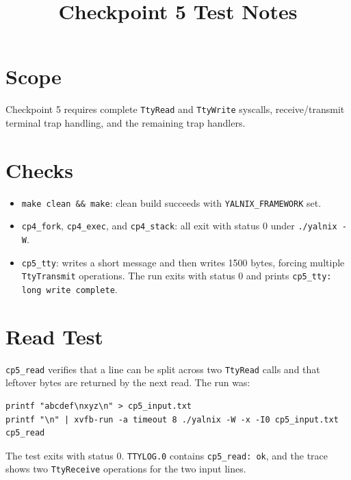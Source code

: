 \documentclass{article}
\title{Checkpoint 5 Test Notes}
\author{}
\date{}
\begin{document}
\maketitle

\section*{Scope}
Checkpoint 5 requires complete \texttt{TtyRead} and \texttt{TtyWrite}
syscalls, receive/transmit terminal trap handling, and the remaining trap
handlers.

\section*{Checks}
\begin{itemize}[leftmargin=*]
  \item \texttt{make clean \&\& make}: clean build succeeds with
        \texttt{YALNIX\_FRAMEWORK} set.
  \item \texttt{cp4\_fork}, \texttt{cp4\_exec}, and \texttt{cp4\_stack}: all
        exit with status 0 under \texttt{./yalnix -W}.
  \item \texttt{cp5\_tty}: writes a short message and then writes 1500 bytes,
        forcing multiple \texttt{TtyTransmit} operations. The run exits with
        status 0 and prints \texttt{cp5\_tty: long write complete}.
\end{itemize}

\section*{Read Test}
\texttt{cp5\_read} verifies that a line can be split across two
\texttt{TtyRead} calls and that leftover bytes are returned by the next read.
The run was:

\begin{lstlisting}[basicstyle=\ttfamily\small]
printf "abcdef\nxyz\n" > cp5_input.txt
printf "\n" | xvfb-run -a timeout 8 ./yalnix -W -x -I0 cp5_input.txt cp5_read
\end{lstlisting}

The test exits with status 0. \texttt{TTYLOG.0} contains
\texttt{cp5\_read: ok}, and the trace shows two \texttt{TtyReceive} operations
for the two input lines.
\end{document}
